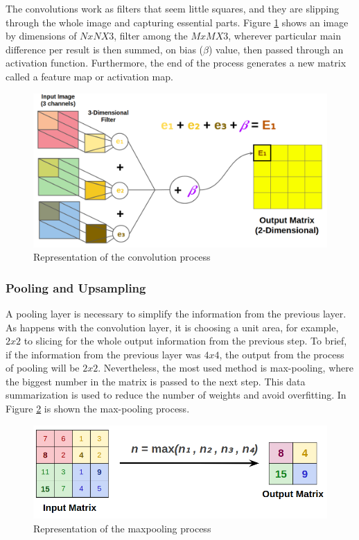 The convolutions work as filters that seem little squares, and they are slipping through the whole image and capturing essential parts.  Figure \ref{fig:bias} shows an image by dimensions of $NxNX3$, filter among the $MxMX3$, wherever particular main difference per result is then summed, on bias ($\beta$) value, then passed through an activation function. Furthermore, the end of the process generates a new matrix called a feature map or activation map.


\begin{figure}[H]
\centering
\includegraphics[scale=0.35]{imagens/three_dim_conv_2.png}
\caption{Representation of the convolution process}
\label{fig:bias}
\end{figure}




\subsubsection{Pooling and Upsampling}\label{sub:pooling}

A pooling layer is necessary to simplify the information from the previous layer. As happens with the convolution layer, it is choosing a unit area, for example, $2x2$ to slicing for the whole output information from the previous step. To brief, if the information from the previous layer was $4x4$, the output from the process of pooling will be $2x2$. Nevertheless, the most used method is max-pooling, where the biggest number in the matrix is passed to the next step. This data summarization is used to reduce the number of weights and avoid overfitting. In Figure \ref{fig:pooling} is shown the max-pooling process.

\begin{figure}[H]
\centering
\includegraphics[scale=0.35]{imagens/max_pooling.png}
\caption{Representation of the maxpooling process}
\label{fig:pooling}
\end{figure}




